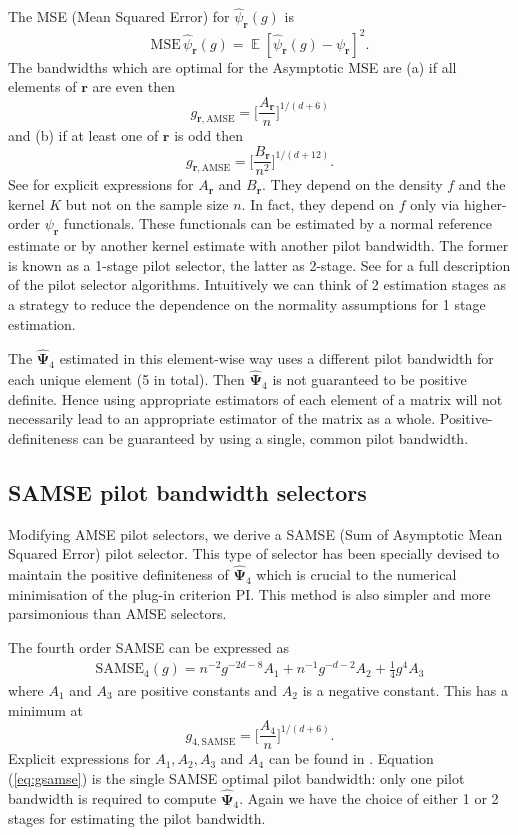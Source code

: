 \documentclass[a4paper,11pt]{article}
\renewcommand{\vec}[1]{\boldsymbol{#1}}
\newcommand{\gmat}[1]{\boldsymbol{#1}}
\def\MSE{\mathrm{MSE}}
\def\AMSE{\mathrm{AMSE}}
\def\SAMSE{\mathrm{SAMSE}}
\def\vecr{\vec{r}}
\DeclareMathOperator{\E}{\boldsymbol{\mathbb{E}}}
\begin{document}
The MSE (Mean Squared Error) for $\hat{\psi}_{\vecr}(g)$ is
$$
\MSE \, \hat{\psi}_{\vecr}(g) = \E [\hat{\psi}_{\vecr}(g) - \psi_{\vecr}]^2. 
$$
The bandwidths which are  optimal for the Asymptotic MSE are 
(a) if all elements of $\vecr$ are even then
\begin{equation}
\label{eq:gamse_even} g_{\vecr, \AMSE} = \bigg[ \frac{A_{\vecr}}{n} 
\bigg]^{1/(d+6)}
\end{equation}
and (b) if at least one of $\vecr$ is odd then 
\begin{equation}
\label{eq:gamse_odd} g_{\vecr, \AMSE} = \bigg[ \frac{B_{\vecr}}{n^2} 
\bigg]^{1/(d+12)}.
\end{equation}
See \citet*{wand1994} for explicit expressions for $A_{\vecr}$ and
$B_{\vecr}$. They depend on the density $f$ and the kernel $K$ but
not on the sample size $n$. In fact, they depend on $f$ only via higher-order
$\psi_{\vecr}$ functionals. These functionals
can be estimated by a normal reference estimate 
or by another kernel estimate with another
pilot bandwidth. The former is known as a 1-stage pilot selector,
the latter as 2-stage. See \citet*{duong2003} for a full description of the 
pilot selector algorithms. 
Intuitively we can think of 2 estimation stages as a strategy to reduce
the dependence on the normality assumptions for 1 stage estimation. 


The $\hat{\gmat{\Psi}}_4$ estimated in this element-wise 
way uses a different pilot bandwidth for each unique element 
(5 in total). Then $\hat{\gmat{\Psi}}_4$ is not guaranteed to be positive
definite.  Hence using appropriate estimators of each element
of a matrix will not necessarily lead to an appropriate estimator
of the matrix as a whole.
Positive-definiteness can be guaranteed by using a single, common pilot bandwidth. 

\subsection{SAMSE pilot bandwidth selectors}
Modifying AMSE pilot selectors, we derive
a SAMSE (Sum of Asymptotic Mean Squared Error) pilot selector.
This type of selector has been specially devised to maintain the
positive definiteness of $\hat{\gmat{\Psi}}_4$ which is
crucial to the numerical minimisation of the plug-in criterion PI. This
method is also simpler and more parsimonious than AMSE
selectors.


The fourth order SAMSE can be expressed as 
\begin{align}
\SAMSE_4(g) = n^{-2}g^{-2d-8} A_1 + n^{-1} g^{-d-2} A_2 + \tfrac{1}{4} g^4 A_3
\end{align}
where $A_1$ and $A_3$ are positive constants and 
$A_2$ is a negative constant.  This has a minimum at 
\begin{equation} 
\label{eq:gsamse} 
g_{4, \SAMSE} =
\bigg[ \frac{A_4}{n}\bigg]^{1/(d+6)}.
\end{equation}
 Explicit expressions for 
$A_1, A_2, A_3$ and $A_4$ can be found in \citet*{duong2003}.
Equation (\ref{eq:gsamse}) is the single SAMSE optimal pilot bandwidth: 
only one pilot bandwidth
is required to compute $\hat{\gmat{\Psi}}_4$.  Again we have the choice of
either 1 or 2 stages for estimating the pilot bandwidth.
\end{document}
